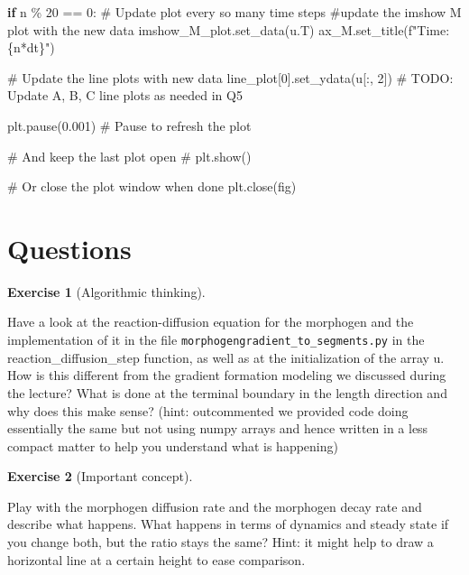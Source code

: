 \documentclass[
  letterpaper,
  DIV=11,
  numbers=noendperiod]{scrreprt}
\newenvironment{Shaded}{\begin{snugshade}}{\end{snugshade}}
\newcommand{\AlertTok}[1]{\textcolor[rgb]{0.68,0.00,0.00}{#1}}
\newcommand{\CommentTok}[1]{\textcolor[rgb]{0.37,0.37,0.37}{#1}}
\newcommand{\ControlFlowTok}[1]{\textcolor[rgb]{0.00,0.23,0.31}{\textbf{#1}}}
\newcommand{\DecValTok}[1]{\textcolor[rgb]{0.68,0.00,0.00}{#1}}
\newcommand{\FloatTok}[1]{\textcolor[rgb]{0.68,0.00,0.00}{#1}}
\newcommand{\NormalTok}[1]{\textcolor[rgb]{0.00,0.23,0.31}{#1}}
\newcommand{\OperatorTok}[1]{\textcolor[rgb]{0.37,0.37,0.37}{#1}}
\newcommand{\SpecialCharTok}[1]{\textcolor[rgb]{0.37,0.37,0.37}{#1}}
\newcommand{\SpecialStringTok}[1]{\textcolor[rgb]{0.13,0.47,0.30}{#1}}
\theoremstyle{definition}
\newtheorem{exercise}{Exercise}[chapter]
\theoremstyle{remark}
\begin{document}
\begin{tcolorbox}
\begin{Shaded}
\begin{Highlighting}[]
    \ControlFlowTok{if}\NormalTok{ n }\OperatorTok{\%} \DecValTok{20} \OperatorTok{==} \DecValTok{0}\NormalTok{:  }\CommentTok{\# Update plot every so many time steps}
        \CommentTok{\#update the imshow M plot with the new data}
\NormalTok{        imshow\_M\_plot.set\_data(u.T)}
\NormalTok{        ax\_M.set\_title(}\SpecialStringTok{f"Time: }\SpecialCharTok{\{}\NormalTok{n}\OperatorTok{*}\NormalTok{dt}\SpecialCharTok{\}}\SpecialStringTok{"}\NormalTok{)}
            
        \CommentTok{\# Update the line plots with new data}
\NormalTok{        line\_plot[}\DecValTok{0}\NormalTok{].set\_ydata(u[:, }\DecValTok{2}\NormalTok{])}
        \CommentTok{\# }\AlertTok{TODO}\CommentTok{: Update A, B, C line plots as needed in Q5}

\NormalTok{    plt.pause(}\FloatTok{0.001}\NormalTok{)  }\CommentTok{\# Pause to refresh the plot}

\CommentTok{\# And keep the last plot open}
\CommentTok{\# plt.show()}

\CommentTok{\# Or close the plot window when done}
\NormalTok{plt.close(fig)}
\end{Highlighting}
\end{Shaded}

\end{tcolorbox}

\section{Questions}\label{questions}

\begin{exercise}[Algorithmic
thinking]\protect\hypertarget{exr-test}{}\label{exr-test}

Have a look at the reaction-diffusion equation for the morphogen and the
implementation of it in the file
\texttt{morphogengradient\_to\_segments.py} in the
reaction\_diffusion\_step function, as well as at the initialization of
the array u. How is this different from the gradient formation modeling
we discussed during the lecture? What is done at the terminal boundary
in the length direction and why does this make sense? (hint:
outcommented we provided code doing essentially the same but not using
numpy arrays and hence written in a less compact matter to help you
understand what is happening)

\end{exercise}

\begin{exercise}[Important
concept]\protect\hypertarget{exr-plain}{}\label{exr-plain}

Play with the morphogen diffusion rate and the morphogen decay rate and
describe what happens. What happens in terms of dynamics and steady
state if you change both, but the ratio stays the same? Hint: it might
help to draw a horizontal line at a certain height to ease comparison.

\end{exercise}
\end{document}
